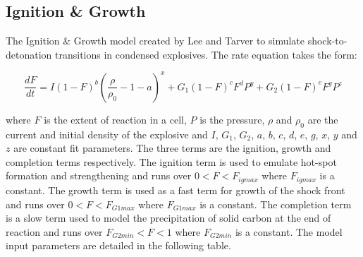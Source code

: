 \newpage
\subsection{Ignition \& Growth} \label {Sec:IandG}

The Ignition \& Growth model created by Lee and Tarver \cite{ref:Lee1980} to simulate shock-to-detonation
transitions in condensed explosives.  The rate equation takes the form:

\begin{equation}
\frac{dF}{dt}=I(1-F)^b\left(\frac{\rho}{\rho_0}-1-a\right)^x+G_1(1-F)^cF^dP^y+G_2(1-F)^eF^gP^z
\label{IandGEqn}
\end{equation}

where $F$ is the extent of reaction in a cell, $P$ is the pressure, $\rho$ and $\rho_0$ are the current and initial density of the
explosive and $I$, $G_1$, $G_2$, $a$, $b$, $c$, $d$, $e$, $g$, $x$, $y$ and $z$ are constant fit parameters. 
The three terms are the ignition, growth and completion terms respectively. The ignition term is used to emulate 
hot-spot formation and strengthening and runs over $0<F<F_{igmax}$ where $F_{igmax}$ is a constant.  The growth
term is used as a fast term for growth of the shock front and runs over $0<F<F_{G1max}$ where $F_{G1max}$ is a
constant.  The completion term is a slow term used to model the precipitation of solid carbon at the end
of reaction and runs over $F_{G2min}<F<1$ where $F_{G2min}$ is a constant. The model input parameters are detailed in the following table.


